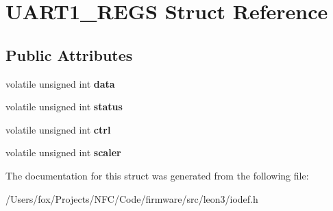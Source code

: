 \hypertarget{struct_u_a_r_t1___r_e_g_s}{
\section{UART1\_\-REGS Struct Reference}
\label{struct_u_a_r_t1___r_e_g_s}
}
\subsection*{Public Attributes}
\begin{DoxyCompactItemize}
\item 
\hypertarget{struct_u_a_r_t1___r_e_g_s_a32f9cd72760d6ee4e952094dfe27c18f}{
volatile unsigned int {\bfseries data}}
\label{struct_u_a_r_t1___r_e_g_s_a32f9cd72760d6ee4e952094dfe27c18f}

\item 
\hypertarget{struct_u_a_r_t1___r_e_g_s_a831fb0c61dec7d187cc85f770960b989}{
volatile unsigned int {\bfseries status}}
\label{struct_u_a_r_t1___r_e_g_s_a831fb0c61dec7d187cc85f770960b989}

\item 
\hypertarget{struct_u_a_r_t1___r_e_g_s_a8124589755760cf86e0f0be175117668}{
volatile unsigned int {\bfseries ctrl}}
\label{struct_u_a_r_t1___r_e_g_s_a8124589755760cf86e0f0be175117668}

\item 
\hypertarget{struct_u_a_r_t1___r_e_g_s_aec9b07f7895e111a8cd48d96d3f23b2d}{
volatile unsigned int {\bfseries scaler}}
\label{struct_u_a_r_t1___r_e_g_s_aec9b07f7895e111a8cd48d96d3f23b2d}

\end{DoxyCompactItemize}


The documentation for this struct was generated from the following file:\begin{DoxyCompactItemize}
\item 
/Users/fox/Projects/NFC/Code/firmware/src/leon3/iodef.h\end{DoxyCompactItemize}
